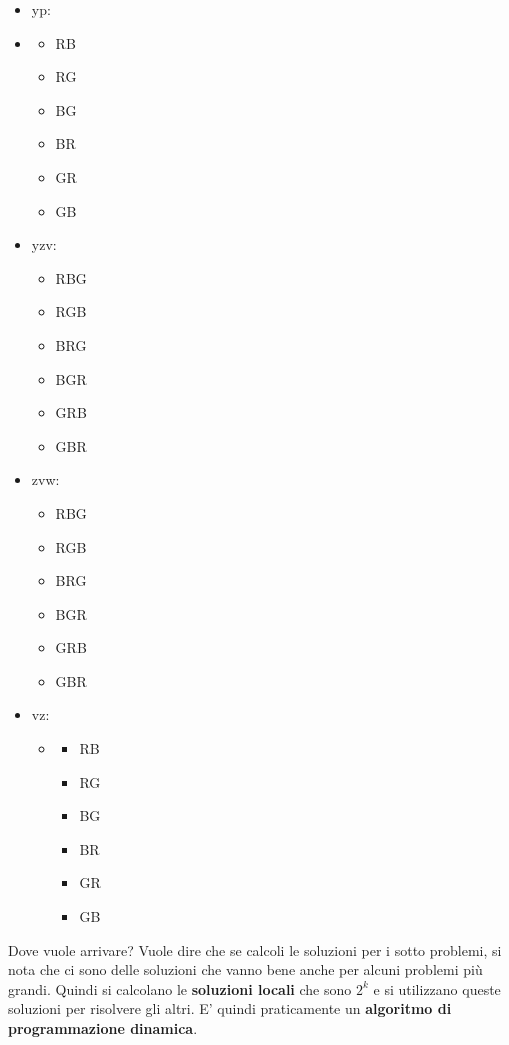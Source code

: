 \begin{itemize}
    \item yp:
    \item \begin{itemize}
              \item RB
              \item RG
              \item BG
              \item BR
              \item GR
              \item GB
          \end{itemize}
    \item yzv:
          \begin{itemize}
              \item RBG
              \item RGB
              \item BRG
              \item BGR
              \item GRB
              \item GBR
          \end{itemize}
    \item zvw:
          \begin{itemize}
              \item RBG
              \item RGB
              \item BRG
              \item BGR
              \item GRB
              \item GBR
          \end{itemize}
    \item vz:
          \begin{itemize}
              \item \begin{itemize}
                        \item RB
                        \item RG
                        \item BG
                        \item BR
                        \item GR
                        \item GB
                    \end{itemize}
          \end{itemize}
\end{itemize}

Dove vuole arrivare? Vuole dire che se calcoli le soluzioni per i sotto
problemi, si nota che ci sono delle soluzioni che vanno bene anche per alcuni
problemi più grandi. Quindi si calcolano le \textbf{soluzioni locali} che sono
$2^k$ e si utilizzano queste soluzioni per risolvere gli altri. E' quindi
praticamente un \textbf{algoritmo di programmazione dinamica}. \newpage
